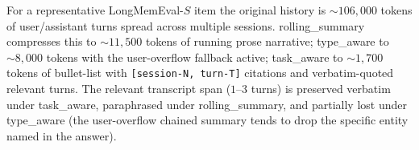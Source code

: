 \documentclass{article}
\begin{document}
For a representative LongMemEval-$S$ item the original history is
$\sim\!106{,}000$ tokens of user/assistant turns spread across multiple
sessions. \textsf{rolling\_summary} compresses this to $\sim\!11{,}500$
tokens of running prose narrative; \textsf{type\_aware} to
$\sim\!8{,}000$ tokens with the user-overflow fallback active;
\textsf{task\_aware} to $\sim\!1{,}700$ tokens of bullet-list with
\verb|[session-N, turn-T]| citations and verbatim-quoted relevant turns.
The relevant transcript span ($1$--$3$ turns) is preserved verbatim
under \textsf{task\_aware}, paraphrased under \textsf{rolling\_summary},
and partially lost under \textsf{type\_aware} (the user-overflow chained
summary tends to drop the specific entity named in the answer).
\end{document}
